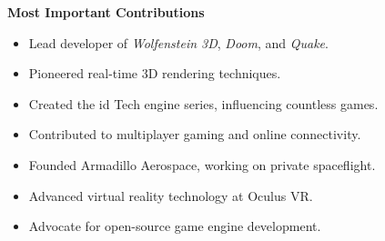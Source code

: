 \documentclass[12pt]{article}
\begin{document}
\textbf{Most Important Contributions}
\begin{multicols}{2}
    \begin{itemize}
        \itemsep 0em
        \item Lead developer of \textit{Wolfenstein 3D}, \textit{Doom}, and \textit{Quake}.
        \item Pioneered real-time 3D rendering techniques.
        \item Created the id Tech engine series, influencing countless games.
        \item Contributed to multiplayer gaming and online connectivity.
        \item Founded Armadillo Aerospace, working on private spaceflight.
        \item Advanced virtual reality technology at Oculus VR.
        \item Advocate for open-source game engine development.
    \end{itemize}
\end{multicols}

\BgThispage


\end{document}
